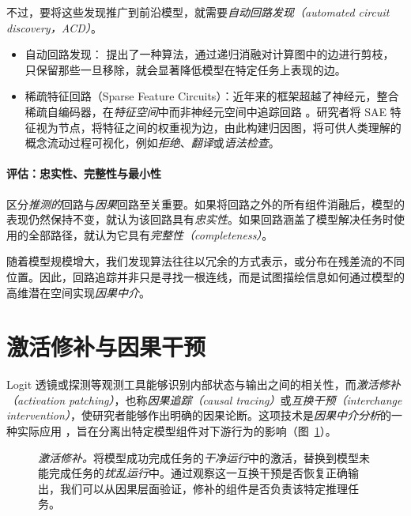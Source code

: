 不过，要将这些发现推广到前沿模型，就需要\emph{自动回路发现（automated circuit discovery，ACD）}。
\begin{itemize}
    \item 自动回路发现：\citet{conmy2023towards} 提出了一种算法，通过递归消融对计算图中的边进行剪枝，只保留那些一旦移除，就会显著降低模型在特定任务上表现的边。
    \item 稀疏特征回路（Sparse Feature Circuits）：近年来的框架超越了神经元，整合稀疏自编码器，在\emph{特征空间}中而非神经元空间中追踪回路 \citep{marks2024sparse}。研究者将 SAE 特征视为节点，将特征之间的权重视为边，由此构建归因图，将可供人类理解的概念流动过程可视化，例如\emph{拒绝}、\emph{翻译}或\emph{语法检查}。
\end{itemize}



\paragraph{评估：忠实性、完整性与最小性}
区分\emph{推测的}回路与\emph{因果}回路至关重要。如果将回路之外的所有组件消融后，模型的表现仍然保持不变，就认为该回路具有\emph{忠实性}。如果回路涵盖了模型解决任务时使用的全部路径，就认为它具有\emph{完整性（completeness）}。

随着模型规模增大，我们发现算法往往以冗余的方式表示，或分布在残差流的不同位置。因此，回路追踪并非只是寻找一根连线，而是试图描绘信息如何通过模型的高维潜在空间实现\emph{因果中介}。


\section{激活修补与因果干预}

Logit 透镜或探测等观测工具能够识别内部状态与输出之间的相关性，而\emph{激活修补（activation patching）}，也称\emph{因果追踪（causal tracing）}或\emph{互换干预（interchange intervention）}，使研究者能够作出明确的因果论断。这项技术是\emph{因果中介分析}的一种实际应用 \citep{vig2020investigating}，旨在分离出特定模型组件对下游行为的影响（图~\ref{fig:activation_patching}）。

\begin{figure}[htbp]
    \centering
    
    \caption{\emph{激活修补。}将模型成功完成任务的\emph{干净运行}中的激活，替换到模型未能完成任务的\emph{扰乱运行}中。通过观察这一互换干预是否恢复正确输出，我们可以从因果层面验证，修补的组件是否负责该特定推理任务。}
    \label{fig:activation_patching}
\end{figure}


